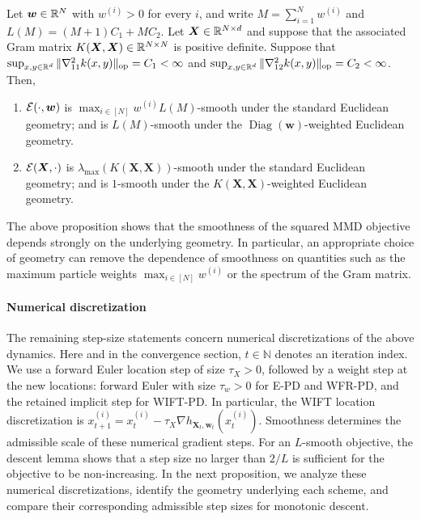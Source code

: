 \begin{prop}
\label{prop:mmd-energy-smoothness}
Let $\bm{w}\in\mathbb{R}^N$ with $w^{(i)}>0$ for every $i$, and write $M=\sum_{i=1}^N w^{(i)}$ and $L(M)=(M+1)C_1+MC_2$.
Let $\bm{X}\in\mathbb{R}^{N\times d}$ and suppose that the associated Gram matrix $K(\bm{X},\bm{X})\in\mathbb{R}^{N\times N}$ is positive definite.
Suppose that  $\sup_{x,y\in\mathbb{R}^d}\|\nabla_{11}^2 k(x,y)\|_{\mathrm{op}} = C_1<\infty$ and $\sup_{x,y\in\mathbb{R}^d}\|\nabla_{12}^2 k(x,y)\|_{\mathrm{op}}=C_2 <\infty$.
Then,
\begin{enumerate}
    \item $\mathcal{E}(\cdot,\bm{w})$ is $\max_{i\in[N]} w^{(i)}L(M)$-smooth under the standard Euclidean geometry; and is $L(M)$-smooth under the $\operatorname{Diag}(\bm{w})$-weighted Euclidean geometry.
    \item $\mathcal{E}(\bm{X}, \cdot)$ is $\lambda_{\max}(K(\bm{X}, \bm{X}))$-smooth under the standard Euclidean geometry; and is $1$-smooth under the $K(\bm{X}, \bm{X})$-weighted Euclidean geometry. 
\end{enumerate} 
\end{prop}

The above proposition shows that the smoothness of the squared MMD objective depends strongly on the underlying geometry. In particular, an appropriate choice of geometry can remove the dependence of smoothness on quantities such as the maximum particle weights $\max_{i\in[N]} w^{(i)}$ or the spectrum of the Gram matrix. 
\paragraph{Numerical discretization}
The remaining step-size statements concern numerical discretizations of the above dynamics. Here and in the convergence section, $t\in\mathbb{N}$ denotes an iteration index. We use a forward Euler location step of size $\tau_X>0$, followed by a weight step at the new locations: forward Euler with size $\tau_w>0$ for E-PD and WFR-PD, and the retained implicit step for WIFT-PD. In particular, the WIFT location discretization is $x_{t+1}^{(i)}=x_t^{(i)}-\tau_X\nabla h_{\bm{X}_t,\bm{w}_t}(x_t^{(i)})$.
Smoothness determines the admissible scale of these numerical gradient steps. For an $L$-smooth objective, the descent lemma shows that a step size no larger than $2/L$ is sufficient for the objective to be non-increasing.
In the next proposition, we analyze these numerical discretizations, identify the geometry underlying each scheme, and compare their corresponding admissible step sizes for monotonic descent.

